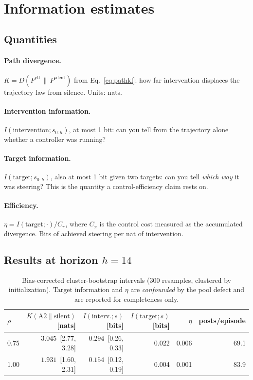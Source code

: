 \documentclass[11pt,a4paper]{article}
\newcommand{\KL}[2]{D\!\left(#1 \,\|\, #2\right)}
\begin{document}
\section{Information estimates}

\subsection{Quantities}

\paragraph{Path divergence.} $K = \KL{P^{\text{ctl}}}{P^{\text{silent}}}$ from
Eq.~\eqref{eq:pathkl}: how far intervention displaces the trajectory law from
silence. Units: nats.

\paragraph{Intervention information.} $I(\text{intervention}; s_{0:h})$, at most
1 bit: can you tell from the trajectory alone whether a controller was running?

\paragraph{Target information.} $I(\text{target}; s_{0:h})$, also at most 1 bit
given two targets: can you tell \emph{which way} it was steering? This is the
quantity a control-efficiency claim rests on.

\paragraph{Efficiency.} $\eta = I(\text{target};\cdot) / C_\pi$, where $C_\pi$ is
the control cost measured as the accumulated divergence. Bits of achieved
steering per nat of intervention.

\subsection{Results at horizon $h = 14$}

\begin{table}[h]
  \centering
  \small
  \begin{tabular}{lrrrrr}
    \toprule
    $\rho$ & $K(\text{A2} \| \text{silent})$ [nats]
           & $I(\text{interv.}; s)$ [bits]
           & $I(\text{target}; s)$ [bits]
           & $\eta$
           & posts/episode \\
    \midrule
    0.75 & $\mathbf{3.045}$ \,[2.77, 3.28] & $\mathbf{0.294}$ \,[0.26, 0.33] & 0.022 & 0.006 & 69.1 \\
    1.00 & $\mathbf{1.931}$ \,[1.60, 2.31] & $\mathbf{0.154}$ \,[0.12, 0.19] & 0.004 & 0.001 & 83.9 \\
    \bottomrule
  \end{tabular}
  \caption{Bias-corrected cluster-bootstrap intervals (300 resamples, clustered
  by initialization). Target information and $\eta$ are \emph{confounded} by the
  pool defect and are reported for completeness only.}
  \label{tab:estimates}
\end{table}
\end{document}
